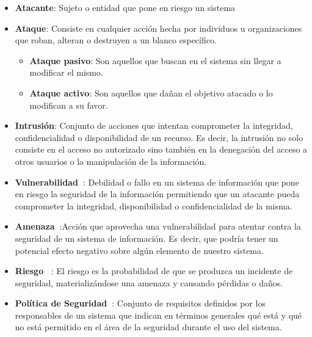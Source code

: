 \begin{itemize}
    \item \textbf{Atacante}: Sujeto o entidad que pone en riesgo un sistema
    
    \item \textbf{Ataque}: Consiste en cualquier acción hecha por individuos u organizaciones  que roban, alteran o destruyen a un blanco específico.
    \begin{itemize}
        \item \textbf{Ataque pasivo}: Son aquellos que buscan en el sistema sin llegar a modificar el mismo.
        
        \item \textbf{Ataque activo}: Son aquellos que dañan el objetivo atacado o lo modifican a su favor.
        
    \end{itemize}
     
    \item \textbf{Intrusión}: Conjunto de acciones que intentan comprometer la integridad, confidencialidad o disponibilidad de un recurso. Es decir, la intrusión no solo consiste en el acceso no autorizado sino también en la denegación del acceso a otros usuarios o la manipulación de la información.
    
    \item \textbf{Vulnerabilidad~\cite{incibe_amenaza}}: Debilidad o fallo en un sistema de información que pone en riesgo la seguridad de la información permitiendo que un atacante pueda comprometer la integridad, disponibilidad o confidencialidad de la misma.
     
     
    \item \textbf{Amenaza~\cite{incibe_amenaza}}:Acción que aprovecha una vulnerabilidad para atentar contra la seguridad de un sistema de información. Es decir, que podría tener un potencial efecto negativo sobre algún elemento de nuestro sistema.
    
    \item \textbf{Riesgo~\cite{incibe_amenaza}} : El riesgo es la probabilidad de que se produzca un incidente de seguridad, materializándose una amenaza y causando pérdidas o daños.
    
    \item \textbf{Política de Seguridad~\cite{conceptos_rediris}}: Conjunto de requisitos definidos por los responsables de un sistema que indican en términos generales qué está y qué no está permitido en el área de la seguridad durante el uso del sistema.
    
\end{itemize}



